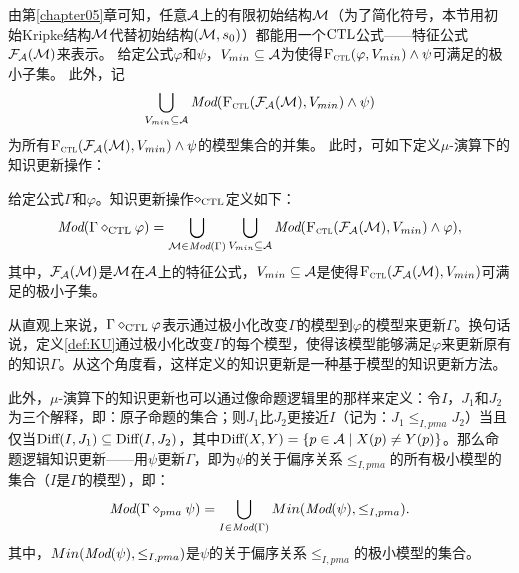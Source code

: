 由第\ref{chapter05}章可知，任意${\cal A}$上的有限初始结构${\cal M}$（为了简化符号，本节用初始Kripke结构${\cal M}$代替初始结构$({\cal M},s_0)$）都能用一个$\textrm{CTL}$公式——特征公式${\cal F}_{{\cal A}}({\cal M})$来表示。%
给定公式$\varphi$和$\psi$，$V_{min}\subseteq {\cal A}$为使得${\textsc{F}_{\textsc{ctl}}}(\varphi, V_{min}) \wedge \psi$可满足的极小子集。
此外，记
$$\bigcup_{V_{min}\subseteq {\cal A}} \textit{Mod}({\textsc{F}_{\textsc{ctl}}}({\cal F}_{{\cal A}}({\cal M}), V_{min}) \wedge \psi)$$ 
为所有${\textsc{F}_{\textsc{ctl}}}({\cal F}_{{\cal A}}({\cal M}), V_{min}) \wedge \psi$的模型集合的并集。
此时，可如下定义$\mu$-演算下的知识更新操作：


\begin{definition}\label{def:KU}
	给定公式$\Gamma$和$\varphi$。知识更新操作$\diamond_{\textrm{CTL}}$定义如下：
	\[
	\textit{Mod}(\Gamma \diamond_{\textrm{CTL}} \varphi) = \bigcup_{{\cal M} \in \textit{Mod}(\Gamma)} \bigcup_{V_{min}\subseteq {\cal A}} \textit{Mod}({\textsc{F}_{\textsc{ctl}}}({\cal F}_{{\cal A}}({\cal M}), V_{min}) \wedge \varphi),
	\]
	其中，${\cal F}_{{\cal A}}({\cal M})$是${\cal M}$在${\cal A}$上的特征公式，$V_{min} \subseteq {\cal A}$是使得${\textsc{F}_{\textsc{ctl}}}({\cal F}_{{\cal A}}({\cal M}), V_{min})$可满足的极小子集。
\end{definition}

从直观上来说，$\Gamma \diamond_{\textrm{CTL}} \varphi$表示通过极小化改变$\Gamma$的模型到$\varphi$的模型来更新$\Gamma$。换句话说，定义\ref{def:KU}通过极小化改变$\Gamma$的每个模型，使得该模型能够满足$\varphi$来更新原有的知识$\Gamma$。从这个角度看，这样定义的知识更新是一种基于模型的知识更新方法。

此外，$\mu$-演算下的知识更新也可以通过像命题逻辑里的那样来定义：令$I$，$J_1$和$J_2$为三个解释，即：原子命题的集合；则$J_1$比$J_2$更接近$I$（记为：$J_1 \leq_{I,pma} J_2$）当且仅当$\textrm{Diff}(I, J_1) \subseteq \textrm{Diff}(I, J_2)$，其中$\textrm{Diff}(X, Y) =\{p\in {\cal A} \mid X(p) \not = Y(p)\}$。那么命题逻辑知识更新——用$\psi$更新$\Gamma$，即为$\psi$的关于偏序关系$\leq_{I,pma}$的所有极小模型的集合（$I$是$\Gamma$的模型），即：
$$\textit{Mod}(\Gamma \diamond_{pma} \psi) = \bigcup_{I \in \textit{Mod}(\Gamma)} Min(\textit{Mod}(\psi), \leq_{I,pma}).$$
其中，$Min(\textit{Mod}(\psi), \leq_{I,pma})$是$\psi$的关于偏序关系$\leq_{I,pma}$的极小模型的集合。

